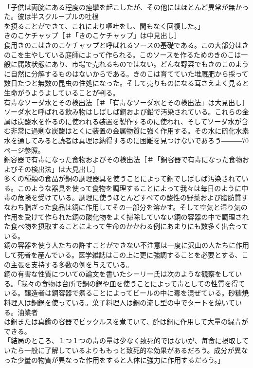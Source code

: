 \documentclass[8pt]{extreport}
\begin{document}
\begin{CJK}{UTF8}{min}
\\	「子供は両腕にある程度の痙攣を起こしたが、その他にはほとんど異常が無かった。彼は半スクループルの吐根
\\	を摂ることができて、これにより嘔吐をし、間もなく回復した。」
\\	きのこケチャップ［＃「きのこケチャップ」は中見出し］
\\	食用きのこはきのこケチャップと呼ばれるソースの基礎である。この大部分はきのこを生やしている庭師によって作られる。このソースを作るためのきのこは一般に腐敗状態にあり、市場で売れるものではない。どんな野菜でもきのこのように自然に分解するものはないからである。きのこは育てていた堆厩肥から採って数日たつと無数の昆虫の住処になった。そして売りものになる茸さえよく見ると生命がうようよしていることが判る。
\\	有毒なソーダ水とその検出法［＃「有毒なソーダ水とその検出法」は大見出し］
\\	ソーダ水と呼ばれる飲み物はしばしば銅および鉛で汚染されている。これらの金属は炭酸水を作るのに使われる装置を製作するのに使われ、そしてソーダ水が含む非常に過剰な炭酸はとくに装置の金属物質に強く作用する。その水に硫化水素水を通してみると読者は真理は納得するのに困難を見つけないであろう―――70ページ参照。
\\	銅容器で有毒になった食物およびその検出法［＃「銅容器で有毒になった食物およびその検出法」は大見出し］
\\	多くの種類の食品が銅の調理器具を使うことによって銅でしばしば汚染されている。このような器具を使って食物を調理することによって我々は毎日のように中毒の危険を受けている。調理に使うほとんどすべての酸性の野菜および脂肪質すなわち脂ぎった食品は銅に作用してその一部分を溶かす。そして空気と湿り気の作用を受けて作られた銅の酸化物をよく掃除していない銅の容器の中で調理された食べ物を摂取することによって生命のかかわる例にあまりにも数多く出会っている。
\\	銅の容器を使う人たちの許すことができない不注意は一度に沢山の人たちに作用して死者を産んでいる。医学雑誌はこの上に更に強調することを必要とする、この主張を支持する多数の例を与えている。
\\	銅の有害な性質についての論文を書いたシーリー氏は次のような観察をしている。「我々の食物は台所で銅の鍋や皿を使うことによって毒としての性質を得ている。醸造者は銅容器で煮ることによってビールの中に毒を混ぜている。砂糖焼料理人は銅鍋を使っている。菓子料理人は銅の流し型の中でタートを焼いている。油業者
\\	は銅または真鍮の容器でピックルスを煮ていて、酢は銅に作用して大量の緑青ができる。
\\	「結局のところ、１つ１つの毒の量は少なく致死的ではないが、毎食に摂取していたら一般に了解しているよりももっと致死的な効果があるだろう。成分が異なった少量の物質が異なった作用をすると人体に強力に作用するだろう。」

\end{CJK}
\end{document}
